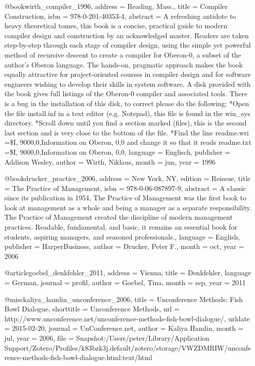 {@book{wirth_compiler_1996,
	address = {Reading, Mass.},
	title = {Compiler {Construction}},
	isbn = {978-0-201-40353-4},
	abstract = {A refreshing antidote to heavy theoretical tomes, this book is a concise, practical guide to modern compiler design and construction by an acknowledged master. Readers are taken step-by-step through each stage of compiler design, using the simple yet powerful method of recursive descent to create a compiler for Oberon-0, a subset of the author's Oberon language.  The hands-on, pragmatic approach makes the book equally attractive for project-oriented courses in compiler design and for software engineers wishing to develop their skills in system software.  A disk provided with the book gives full listings of the Oberon-0 compiler and associated tools.  There is a bug in the installation of this disk, to correct please do the following: *Open the file install.inf in a text editor (e.g. Notepad), this file is found in the win\_sys directory.  *Scroll down until you find a section marked (files), this is the second last section and is very close to the bottom of the file.  *Find the line readme.wri =\$I, 9000,0,Information on Oberon, 0,0 and change it so that it reads readme.txt =\$I, 9000,0,Information on Oberon, 0,0},
	language = {Englisch},
	publisher = {Addison Wesley},
	author = {Wirth, Niklaus},
	month = jun,
	year = {1996}
}

@book{drucker_practice_2006,
	address = {New York, NY},
	edition = {Reissue},
	title = {The {Practice} of {Management}},
	isbn = {978-0-06-087897-9},
	abstract = {A classic since its publication in 1954, The Practice of Management was the first book to look at management as a whole and being a manager as a separate responsibility. The Practice of Management created the discipline of modern management practices. Readable, fundamental, and basic, it remains an essential book for students, aspiring managers, and seasoned professionals.},
	language = {English},
	publisher = {HarperBusiness},
	author = {Drucker, Peter F.},
	month = oct,
	year = {2006}
}

@article{goebel_denkfehler_2011,
	address = {Vienna},
	title = {Denkfehler},
	language = {German},
	journal = {profil},
	author = {Goebel, Tina},
	month = sep,
	year = {2011}
}

@misc{kaliya_hamlin_unconference_2006,
	title = {Unconference {Methods}: {Fish} {Bowl} {Dialogue}},
	shorttitle = {Unconference {Methods}},
	url = {http://www.unconference.net/unconference-methods-fish-bowl-dialogue/},
	urldate = {2015-02-20},
	journal = {UnConference.net},
	author = {{Kaliya Hamlin}},
	month = jul,
	year = {2006},
	file = {Snapshot:/Users/peter/Library/Application Support/Zotero/Profiles/k83bzk3j.default/zotero/storage/VWZDMRIW/unconference-methods-fish-bowl-dialogue.html:text/html}
}

}

